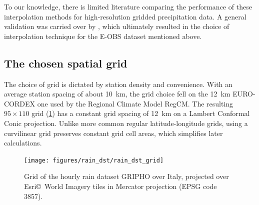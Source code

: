 To our knowledge, there is limited literature comparing the performance of these interpolation methods for high-resolution gridded precipitation data. A general validation was carried over by \citet{Hofstra2008}, which ultimately resulted in the choice of interpolation technique for the E-OBS dataset mentioned above.

\subsection{The chosen spatial grid}
The choice of grid is dictated by station density and convenience. With an average station spacing of about \SI{10}{\kilo\meter}, the grid choice fell on the \SI{12}{\kilo\meter} EURO-CORDEX one used by the Regional Climate Model RegCM. The resulting $95 \times 110$ grid (\cref{fig:rain_dst_grid}) has a constant grid spacing of \SI{12}{\kilo\meter} on a Lambert Conformal Conic projection. Unlike more common regular latitude-longitude grids, using a curvilinear grid preserves constant grid cell areas, which simplifies later calculations.

\begin{figure}
    \centering
    \texttt{[image: figures/rain\_dst/rain\_dst\_grid]}
    \decoRule
    \caption[Grid for the hourly rain dataset GRIPHO over Italy]{Grid of the hourly rain dataset GRIPHO over Italy, projected over Esri\copyright \ World Imagery tiles in Mercator projection (EPSG code 3857).} \label{fig:rain_dst_grid}
\end{figure}

